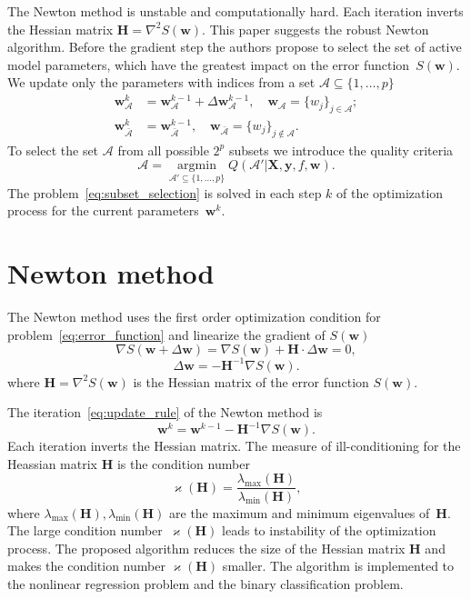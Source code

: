 \documentclass[a4paper,12pt]{article}
\renewcommand{\kappa}{\ensuremath{\varkappa}}
\theoremstyle{plain} %
\theoremstyle{definition} %
\theoremstyle{remark} %
\newcommand{\bw}{\mathbf{w}}
\newcommand{\by}{\mathbf{y}}
\newcommand{\cA}{\mathcal{A}}
\newcommand{\bH}{\mathbf{H}}
\newcommand{\bX}{\mathbf{X}}
\newcommand{\argmin}{\mathop{\arg \min}\limits}
\begin{document}
	The Newton method is unstable and computationally hard. Each iteration inverts the Hessian matrix $\bH = \nabla^2 S(\bw)$.
	This paper suggests the robust Newton algorithm. 
	Before the gradient step the authors propose to select the set of active model parameters, which have the greatest impact on the error function~$S(\bw)$.
	We update only the parameters with indices from a set $\cA \subseteq \{ 1, \dots, p \}$
	\begin{align*}
	\bw_{\cA}^k &= \bw_{\cA}^{k - 1} + \Delta \bw_{\cA}^{k - 1}, \quad \bw_{\cA} = \{w_j\}_{j \in \cA}; \\
	\bw_{\bar{\cA}}^k &= \bw_{\bar{\cA}}^{k - 1}, \quad \bw_{\bar{\cA}} = \{w_j\}_{j \notin \cA}.
	\end{align*}
	To select the set $\cA$ from all possible $2^p$ subsets we introduce the quality criteria 
	\begin{equation}
		\cA = \argmin_{\cA' \subseteq \{1, \dots, p\}} Q(\cA' | \bX, \by, f, \bw).
		\label{eq:subset_selection}
	\end{equation}
	The problem~\eqref{eq:subset_selection} is solved in each step $k$ of the optimization process for the current parameters~$\bw^k$.
	
	\section*{Newton method}
	
	The Newton method uses the first order optimization condition for problem~\eqref{eq:error_function} and linearize the gradient of $S(\bw)$
	\[
		\nabla S (\bw + \Delta \bw) = \nabla S(\bw) + \bH \cdot \Delta \bw = 0,
	\]
	\[
		\Delta \bw = - \bH^{-1} \nabla S(\bw).
	\]
	where $\bH = \nabla^2 S(\bw)$ is the Hessian matrix of the error function $S(\bw)$.
	
	The iteration~\eqref{eq:update_rule} of the Newton method is
	\[
		\bw^k = \bw^{k-1} - \bH^{-1} \nabla S(\bw).
	\]
	Each iteration inverts the Hessian matrix.
	The measure of ill-conditioning for the Heassian matrix $\bH$ is the condition number
	\[
		\kappa(\bH) = \frac{\lambda_{\text{max}}(\bH)}{\lambda_{\text{min}}(\bH)},
	\]
	where $\lambda_{\text{max}}(\bH), \lambda_{\text{min}}(\bH)$ are the maximum and minimum eigenvalues of~$\bH$. The large condition number~$\kappa(\bH)$ leads to instability of the optimization process.
	The proposed algorithm reduces the size of the Hessian matrix $\bH$ and makes the condition number $\kappa(\bH)$ smaller.
	The algorithm is implemented to the nonlinear regression problem and the binary classification problem.
	
\end{document}
